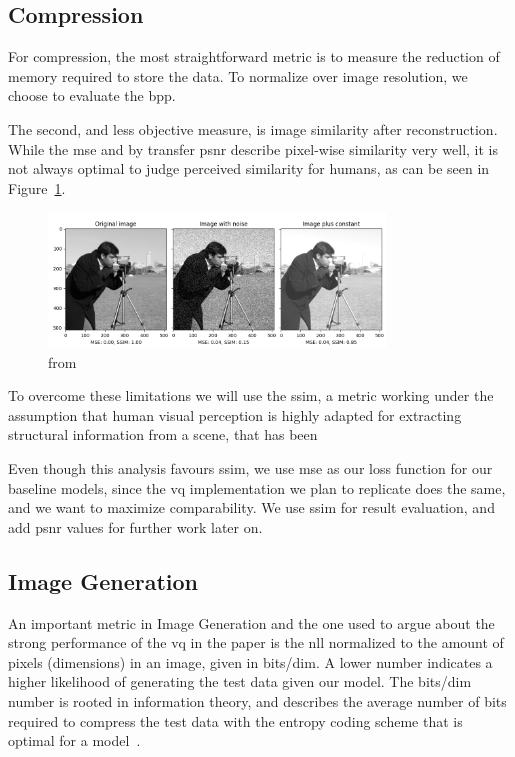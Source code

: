\subsection{Compression}\label{subsec:compression}
For compression, the most straightforward metric is to measure the reduction of memory required to
store the data.
To normalize over image resolution, we choose to evaluate the \ac{bpp}.

The second, and less objective measure, is image similarity after reconstruction.
While the \ac{mse} and by transfer \ac{psnr} describe pixel-wise similarity very well, it is not
always optimal to judge perceived similarity for humans, as can be seen in Figure~\ref{fig:mse_ssim}.

\begin{figure}[ht]
    \centering
    \includegraphics[width=0.8\textwidth]{images/ssim_mse}
    \caption{from~\cite{scikit-ssim}}
    \label{fig:mse_ssim}
\end{figure}

To overcome these limitations we will use the \ac{ssim}, a metric working under the assumption that human visual
perception is highly adapted for extracting structural information from a scene, that has been

Even though this analysis favours \ac{ssim}, we use \ac{mse} as our loss function for our baseline models,
since the \ac{vq} implementation we plan to replicate does the same, and we want to maximize comparability.
We use \ac{ssim} for result evaluation, and add \ac{psnr} values for further work later on.

\subsection{Image Generation}\label{subsec:image-generation}
An important metric in Image Generation and the one used to argue about the strong performance of the \ac{vq} in the
paper is the \ac{nll} normalized to the amount of pixels (dimensions) in an image, given in bits/dim.
A lower number indicates a higher likelihood of generating the test data given our model.
The bits/dim number is rooted in information theory, and describes the average number of bits required to
compress the test data with the entropy coding scheme that is optimal for a model~\cite{shannon}.

